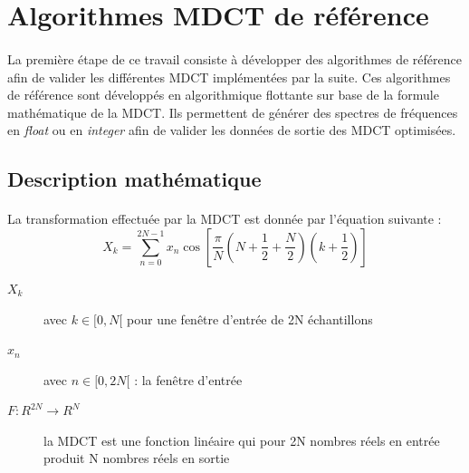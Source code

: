 \documentclass{article}
\begin{document}



    \newpage
    \section{Algorithmes MDCT de référence}

    \paragraph{}
    La première étape de ce travail consiste à développer des algorithmes de référence afin de valider les différentes MDCT implémentées par la suite. Ces algorithmes de référence sont développés en algorithmique flottante sur base de la formule mathématique de la MDCT. Ils permettent de générer des spectres de fréquences en \emph{float} ou en \emph{integer} afin de valider les données de sortie des MDCT optimisées.


    \subsection{Description mathématique}
    \label{sec:desc-math}

    \paragraph{}
    La transformation effectuée par la MDCT est donnée par l'équation suivante\cite{wiki:MDCT} :
    $$X_k = \sum_{n=0}^{2N-1} x_n \cos \left[ \frac{\pi}{N} \left( N + \frac{1}{2} + \frac{N}{2} \right) \left( k + \frac{1}{2} \right) \right]$$
    \begin{description}
        \item[$X_k$] avec $k \in [0, N[$ pour une fenêtre d'entrée de 2N échantillons
        \item[$x_n$] avec $n \in [0, 2N[$ : la fenêtre d'entrée
        \item[$F: R^{2N} \rightarrow R^N$] la MDCT est une fonction linéaire qui pour 2N nombres réels en entrée produit N nombres réels en sortie
    \end{description}\label{test}
\end{document}
